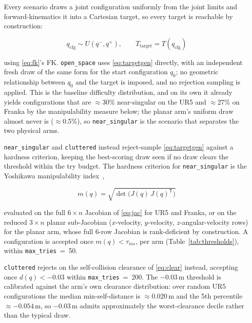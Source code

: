 \documentclass[10pt,conference]{IEEEtran}
\newcommand{\tp}{^{\mathsf{T}}}                       %
\begin{document}
Every scenario draws a joint configuration uniformly from the joint limits and
forward-kinematics it into a Cartesian target, so every target is reachable by
construction:

\begin{equation}
q_{\mathrm{cfg}} \sim U(q^-, q^+),
\qquad T_{\mathrm{target}} = T(q_{\mathrm{cfg}})
\label{eq:targetgen}
\end{equation}

using \eqref{eq:fk}'s FK. \texttt{open\_space} uses \eqref{eq:targetgen}
directly, with an independent fresh draw of the same form for the start
configuration $q_0$; no geometric relationship between $q_0$ and the target is
imposed, and no rejection sampling is applied. This is the baseline difficulty
distribution, and on its own it already yields configurations that are
$\approx$30\% near-singular on the UR5 and $\approx$27\% on Franka by the
manipulability measure below; the planar arm's uniform draw almost never is
($\approx$0.5\%), so \texttt{near\_singular} is the scenario that separates the
two physical arms.

\texttt{near\_singular} and \texttt{cluttered} instead reject-sample
\eqref{eq:targetgen} against a hardness criterion, keeping the best-scoring draw
seen if no draw clears the threshold within the try budget. The hardness
criterion for \texttt{near\_singular} is the Yoshikawa manipulability
index~\cite{b5},

\begin{equation}
m(q) = \sqrt{\det\big( J(q)\,J(q)\tp \big)}
\label{eq:manip}
\end{equation}

evaluated on the full $6 \times n$ Jacobian of \eqref{eq:jac} for UR5 and Franka,
or on the reduced $3 \times n$ planar sub-Jacobian ($x$-velocity, $y$-velocity,
$z$-angular-velocity rows) for the planar arm, whose full 6-row Jacobian is
rank-deficient by construction. A configuration is accepted once
$m(q) < \tau_{ms}$, per arm (Table~\ref{tab:thresholds}), within
\texttt{max\_tries}~=~50.

\texttt{cluttered} rejects on the self-collision clearance of \eqref{eq:clear}
instead, accepting once $d(q) < -0.03$ within \texttt{max\_tries}~=~200. The
$-0.03$\,m threshold is calibrated against the arm's own clearance distribution:
over random UR5 configurations the median min-self-distance is
$\approx$0.020\,m and the 5th percentile $\approx-0.054$\,m, so $-0.03$\,m admits
approximately the worst-clearance decile rather than the typical draw.
\end{document}
